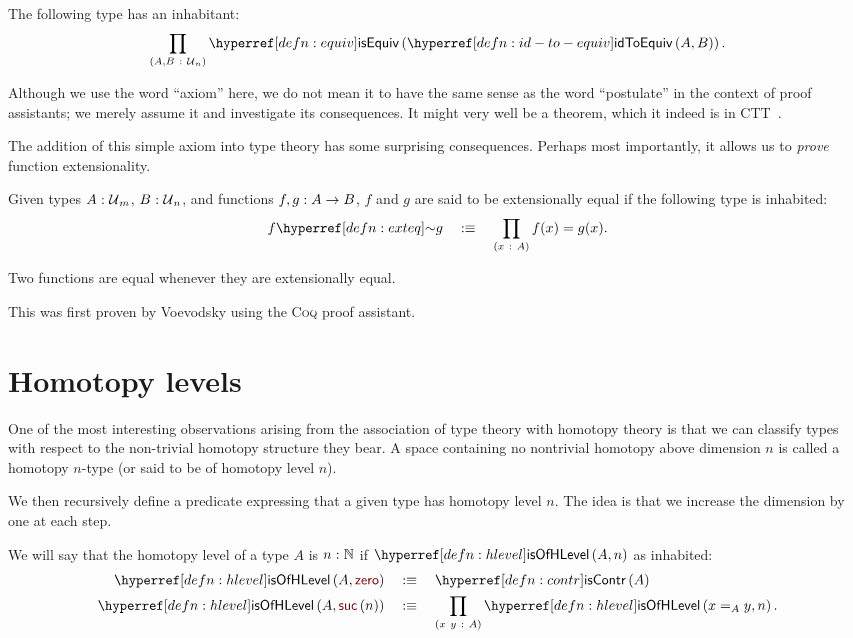 \begin{ax}[Univalence]\label{ax:ua}
  The following type has an inhabitant:
  \begin{equation*}
    \pity{A, B}{\univ{}_n}{\isequiv{\idtoeqv{A}{B}}}.
  \end{equation*}
\end{ax}

Although we use the word ``axiom'' here, we do not mean it to have the same sense as the
word ``postulate'' in the context of proof assistants; we merely assume it and investigate
its consequences. It might very well be a theorem, which it indeed is in CTT~\cite{CCHM}.

The addition of this simple axiom into type theory has some surprising consequences.
Perhaps most importantly, it allows us to \emph{prove} function extensionality.
\begin{defn}\label{defn:exteq}
  Given types $A\hspace{0.1mm}:\hspace{0.1mm}\mathcal{U}{}_m$, $B\hspace{0.1mm}:\hspace{0.1mm}\mathcal{U}{}_n$, and functions
  $f, g:A \rightarrow B$, $f$ and $g$ are said to be extensionally equal if the following
  type is inhabited:
  \begin{equation*}
    \exteq{f}{g} \quad\is\quad \pity{x}{A}{f(x) = g(x)}.
  \end{equation*}
\end{defn}

\begin{prop}\label{prop:funext}
  Two functions are equal whenever they are extensionally equal.
\end{prop}

This was first proven by Voevodsky using the \textsc{Coq} proof assistant.

\section{Homotopy levels}

One of the most interesting observations arising from the association of type theory with
homotopy theory is that we can classify types with respect to the non-trivial homotopy
structure they bear. A space containing no nontrivial homotopy above dimension $n$ is
called a homotopy $n$-type (or said to be of homotopy level $n$).

We then recursively define a predicate expressing that a given type has homotopy level
$n$. The idea is that we increase the dimension by one at each step.
\begin{defn}\label{defn:hlevel}
  We will say that the homotopy level of a type $A$ is $n\hspace{0.1mm}:\hspace{0.1mm}\mathbb{N}$ if
  $\isofhlevel{A}{n}$ as inhabited:
  \begin{align*}
    \isofhlevel{A}{\zero{}} &\quad\is\quad \iscontr{A}\\
    \isofhlevel{A}{\suc{n}} &\quad\is\quad \pity{x~y}{A}{\isofhlevel{x =_A y}{n}}.
  \end{align*}
\end{defn}

